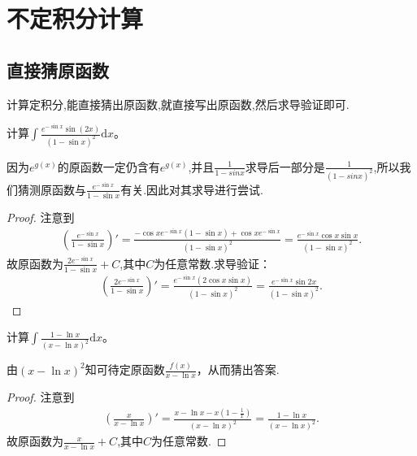 \documentclass[../../main.tex]{subfiles}
\begin{document}
\section{不定积分计算}

\subsection{直接猜原函数}

计算定积分,能直接猜出原函数,就直接写出原函数,然后求导验证即可.

\vspace{0.5cm}

\begin{example}
计算\(\int \frac{e^{-\sin x}\sin(2x)}{(1 - \sin x)^2}\mathrm{d}x\)。
\end{example}
\begin{note}
因为$e^{g(x)}$的原函数一定仍含有$e^{g(x)}$,并且$\frac{1}{1-sinx}$求导后一部分是$\frac{1}{(1-sinx)^2}$,所以我们猜测原函数与$\frac{e^{-\sin x}}{1-\sin x}$有关.因此对其求导进行尝试.
\end{note}
\begin{proof}
注意到
\begin{align*}
\left(\frac{e^{-\sin x}}{1 - \sin x}\right)' = \frac{-\cos x e^{-\sin x}(1 - \sin x)+\cos x e^{-\sin x}}{(1 - \sin x)^2}
=\frac{e^{-\sin x}\cos x\sin x}{(1 - \sin x)^2}.
\end{align*}
故原函数为\(\frac{2e^{-\sin x}}{1 - \sin x}+C\),其中$C$为任意常数.求导验证：
\begin{align*}
\left(\frac{2e^{-\sin x}}{1 - \sin x}\right)'=\frac{e^{-\sin x}(2\cos x\sin x)}{(1 - \sin x)^2}=\frac{e^{-\sin x}\sin 2x}{(1 - \sin x)^2}.
\end{align*} 

\end{proof}

\begin{example}
计算\(\int \frac{1 - \ln x}{(x - \ln x)^2}\mathrm{d}x\)。
\end{example}
\begin{note}
由\((x - \ln x)^2\)知可待定原函数\(\frac{f(x)}{x - \ln x}\)，从而猜出答案.
\end{note}
\begin{proof}
注意到
\begin{align*}
\left( \frac{x}{x-\ln x} \right) \prime =\frac{x-\ln x-x\left( 1-\frac{1}{x} \right)}{\left( x-\ln x \right) ^2}=\frac{1-\ln x}{\left( x-\ln x \right) ^2}.
\end{align*}
故原函数为$\frac{x}{x-\ln x}+C$,其中$C$为任意常数.

\end{proof}
\end{document}
